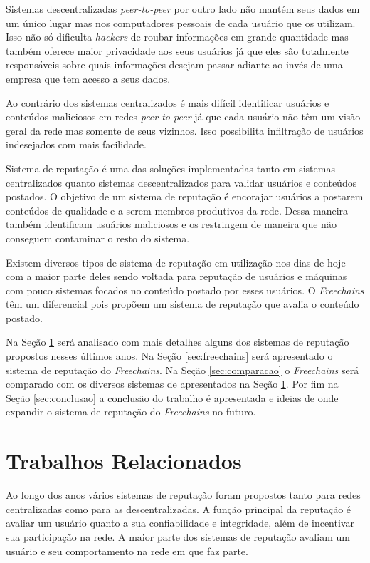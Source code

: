 \documentclass[12pt]{article}
\newcommand{\FC} {\emph{Freechains}\xspace}
\newcommand{\PtoP} {\emph{peer-to-peer}\xspace}
\begin{document}
Sistemas descentralizadas \PtoP por outro lado não mantém seus dados em um único lugar mas nos computadores pessoais de cada usuário que os utilizam. Isso não só dificulta \emph{hackers} de roubar informações em grande quantidade mas também oferece maior privacidade aos seus usuários já que eles são totalmente responsáveis sobre quais informações desejam passar adiante ao invés de uma empresa que tem acesso a seus dados.

Ao contrário dos sistemas centralizados é mais difícil identificar usuários e conteúdos maliciosos em redes \PtoP já que cada usuário não têm um visão geral da rede mas somente de seus vizinhos. Isso possibilita  infiltração de usuários indesejados com mais facilidade. 

Sistema de reputação é uma das soluções implementadas tanto em sistemas centralizados quanto sistemas descentralizados para validar usuários e conteúdos postados. O objetivo de um sistema de reputação é encorajar usuários a postarem conteúdos de qualidade e a serem membros produtivos da rede. Dessa maneira também identificam usuários maliciosos e os restringem de maneira que não conseguem contaminar o resto do sistema.

Existem diversos tipos de sistema de reputação em utilização nos dias de hoje com a maior parte deles sendo voltada para reputação de usuários e máquinas com pouco sistemas focados no conteúdo postado por esses usuários. O \FC têm um diferencial pois propõem um sistema de reputação que avalia o conteúdo postado. 

Na Seção \ref{sec:trabrec} será analisado com mais detalhes alguns dos sistemas de reputação propostos nesses últimos anos. Na Seção \ref{sec:freechains} será apresentado o sistema de reputação do \FC. Na Seção \ref{sec:comparacao} o \FC será comparado com os diversos sistemas de apresentados na Seção \ref{sec:trabrec}. Por fim na Seção \ref{sec:conclusao} a conclusão do trabalho é apresentada e ideias de onde expandir o sistema de reputação do \FC no futuro.

\section{Trabalhos Relacionados} \label{sec:trabrec}

Ao longo dos anos vários sistemas de reputação foram propostos tanto para redes centralizadas como para as descentralizadas. A função principal da reputação é avaliar um usuário quanto a sua confiabilidade e integridade, além de incentivar sua participação na rede. A maior parte dos sistemas de reputação avaliam um usuário e seu comportamento na rede em que faz parte. 
\end{document}
